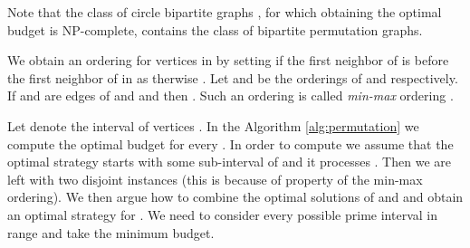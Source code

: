 \documentclass[letterpaper,11pt,abstracton]{scrartcl}
\begin{document}
Note that the class of circle bipartite graphs , for which
obtaining the optimal budget is NP-complete, contains the class of
bipartite permutation graphs.

We obtain an ordering  for vertices in  by setting  if the first neighbor of
 is before the first neighbor of  in  as therwise . Let  and  be the orderings of  and 
respectively. If  and  are edges of  and  and  then . 
Such an ordering is called {\em min-max} ordering \cite{GHRY08}.

 Let  denote the interval of vertices 
. In the Algorithm \ref{alg:permutation} we compute the optimal budget for every . In order to compute  we assume that the optimal 
strategy starts with some sub-interval  of 
 and it processes . Then we are left with two disjoint instances  (this is because of property of the min-max ordering). We then argue
how to combine the optimal solutions of  and  and obtain an optimal strategy for . We need to consider every
possible prime interval  in range  and take the minimum budget.  
\end{document}
